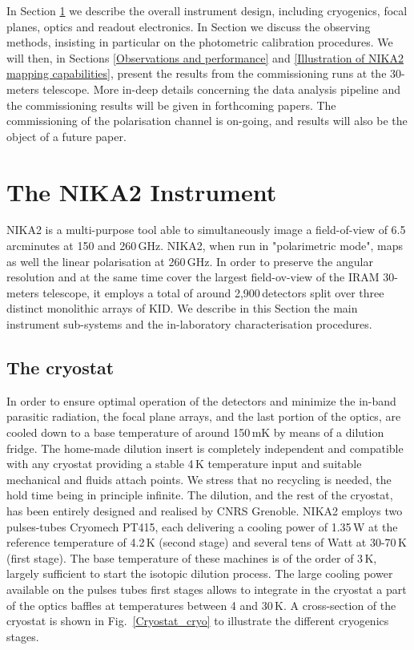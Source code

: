 \documentclass[]{aa} %
\begin{document}
In Section \ref{The NIKA2 Instrument} we describe the overall instrument design, including cryogenics, focal planes, optics and readout electronics. In Section \label{Measurement principle} we discuss the observing methods, insisting in particular on the photometric calibration procedures. We will then, in Sections \ref{Observations and performance} and \ref{Illustration of NIKA2 mapping capabilities}, present the results from the commissioning runs at the 30-meters telescope. More in-deep details concerning the data analysis pipeline and the commissioning results will be given in forthcoming papers. The commissioning of the polarisation channel is on-going, and results will also be the object of a future paper.


\section{The NIKA2 Instrument}
\label{The NIKA2 Instrument}

NIKA2 is a multi-purpose tool able to simultaneously image a field-of-view of 6.5\,arcminutes at 150 and 260\,GHz. NIKA2, when run in "polarimetric mode", maps as well the linear polarisation  at 260\,GHz. In order to preserve the angular resolution and at the same time cover the largest field-ov-view of the IRAM 30-meters telescope, it employs a total of around 2,900\,detectors split over three distinct monolithic arrays of KID. We describe in this Section the main instrument sub-systems and the in-laboratory characterisation procedures.

 \subsection{The cryostat}

In order to ensure optimal operation of the detectors and minimize the in-band parasitic radiation, the focal plane arrays, and the last portion of the optics, are cooled down to a base temperature of around 150\,mK by means of a dilution fridge. The home-made dilution insert is completely independent and compatible with any cryostat providing a stable 4\,K temperature input and suitable mechanical and fluids attach points. We stress that no recycling is needed, the hold time being in principle infinite. The dilution, and the rest of the cryostat, has been entirely designed and realised by CNRS Grenoble. NIKA2 employs two pulses-tubes Cryomech PT415, each delivering a cooling power of 1.35\,W at the reference temperature of 4.2\,K (second stage) and several tens of Watt at 30-70\,K (first stage). The base temperature of these machines is of the order of 3\,K, largely sufficient to start the isotopic dilution process. The large cooling power available on the pulses tubes first stages allows to integrate in the cryostat a part of the optics baffles at temperatures between 4 and 30\,K. A cross-section of the cryostat is shown in Fig.~\ref{Cryostat_cryo} to illustrate the different cryogenics stages.
\end{document}
